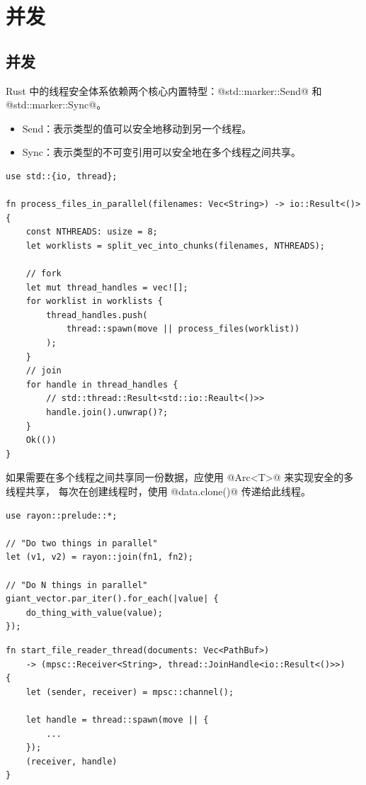 \section{并发}
\subsection{并发}
Rust 中的线程安全体系依赖两个核心内置特型：@std::marker::Send@ 和 @std::marker::Sync@。
\begin{itemize}[itemsep=0.25em, parsep=0pt]
    \item Send：表示类型的值可以安全地移动到另一个线程。
    \item Sync：表示类型的不可变引用可以安全地在多个线程之间共享。
\end{itemize}

\begin{code}[title=fork and join]
    \begin{verbatim}
use std::{io, thread};

fn process_files_in_parallel(filenames: Vec<String>) -> io::Result<()> {
    const NTHREADS: usize = 8;
    let worklists = split_vec_into_chunks(filenames, NTHREADS);

    // fork
    let mut thread_handles = vec![];
    for worklist in worklists {
        thread_handles.push(
            thread::spawn(move || process_files(worklist))
        );
    }
    // join
    for handle in thread_handles {
        // std::thread::Result<std::io::Reault<()>>
        handle.join().unwrap()?;  
    }
    Ok(())
}
\end{verbatim}
\end{code}

如果需要在多个线程之间共享同一份数据，应使用 @Arc<T>@ 来实现安全的多线程共享，
每次在创建线程时，使用 @data.clone()@ 传递给此线程。

\begin{code}[title=rayon]
    \begin{verbatim}
use rayon::prelude::*;

// "Do two things in parallel"
let (v1, v2) = rayon::join(fn1, fn2);

// "Do N things in parallel"
giant_vector.par_iter().for_each(|value| {
    do_thing_with_value(value);
});
\end{verbatim}
\end{code}

\begin{code}[title=channel]
    \begin{verbatim}
fn start_file_reader_thread(documents: Vec<PathBuf>)
    -> (mpsc::Receiver<String>, thread::JoinHandle<io::Result<()>>) 
{
    let (sender, receiver) = mpsc::channel();

    let handle = thread::spawn(move || {
        ... 
    });
    (receiver, handle)
}
\end{verbatim}
\end{code}

